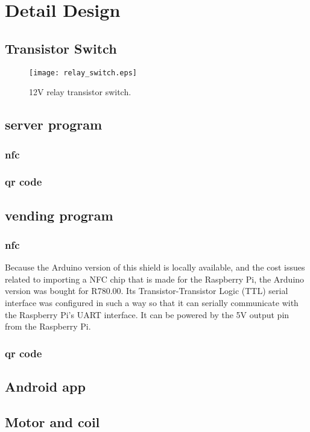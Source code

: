 \chapter{Detail Design}

\section{Transistor Switch}

\begin{figure}[h]
\centering
\texttt{[image: relay\_switch.eps]}
\caption{12V relay transistor switch. }
\end{figure}

\section{server program}
\subsection{nfc}
\subsection{qr code}

\section{vending program}
\subsection{nfc}

Because the Arduino version of this shield is locally available, and the cost issues related
to importing a NFC chip that is made for the Raspberry Pi, the Arduino version was bought for 
R780.00. Its Transistor-Transistor Logic (TTL) serial interface was configured in such a way
so that it can serially communicate with the Raspberry Pi's UART interface. It can be powered
by the 5V output pin from the Raspberry Pi. 

\subsection{qr code}

\section{Android app}

\section{Motor and coil}